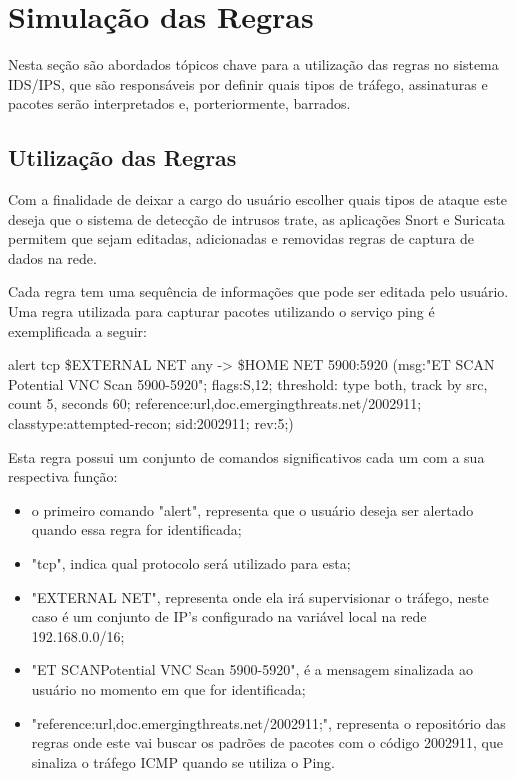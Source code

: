 \chapter{Simulação das Regras}
\label{chap:rules}

Nesta seção são abordados tópicos chave para a utilização das regras no sistema
IDS/IPS, que são responsáveis por definir quais tipos de tráfego, assinaturas e
pacotes serão interpretados e, porteriormente, barrados.

\section{Utilização das Regras}
Com a finalidade de deixar a cargo do usuário escolher quais tipos de ataque este deseja
que o sistema de detecção de intrusos trate, as aplicações Snort e Suricata permitem
que sejam editadas, adicionadas e removidas regras de captura de dados na rede.


Cada regra tem uma sequência de informações que pode ser editada pelo usuário.
Uma regra utilizada para capturar pacotes utilizando o serviço ping é exemplificada
a seguir:


\begin{framed}
alert tcp \$EXTERNAL NET any -> \$HOME NET 5900:5920 (msg:"ET SCAN
Potential VNC Scan 5900-5920"; flags:S,12; threshold: type both, track by src,
count 5, seconds 60; reference:url,doc.emergingthreats.net/2002911;
classtype:attempted-recon; sid:2002911; rev:5;)
\end{framed}

Esta regra possui um conjunto de comandos significativos cada um com a sua respectiva
função:

\begin{itemize}
  \item o primeiro comando "alert", representa que o usuário deseja ser alertado quando
  essa regra for identificada;
  \item  "tcp", indica qual protocolo será utilizado para esta;
  \item "EXTERNAL NET", representa onde ela irá supervisionar o tráfego, neste caso é um
  conjunto de IP's configurado na variável local na rede 192.168.0.0/16;
  \item "ET SCANPotential VNC Scan 5900-5920", é a mensagem sinalizada ao usuário no momento
  em que for identificada;
  \item "reference:url,doc.emergingthreats.net/2002911;",
 representa o repositório das regras onde este vai buscar os padrões de pacotes
 com o código 2002911, que sinaliza o tráfego ICMP quando se utiliza o Ping.
\end{itemize}

